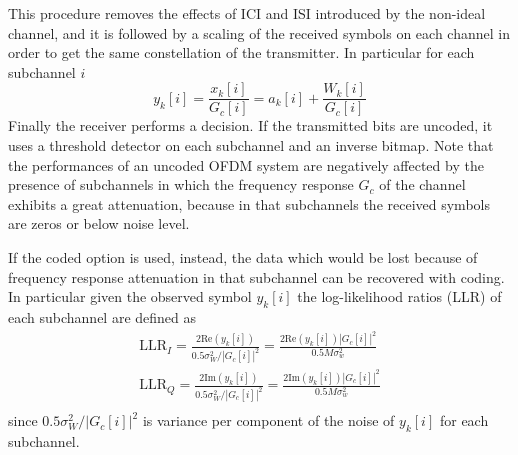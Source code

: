 \documentclass[10pt]{article}
\begin{document}
This procedure removes the effects of ICI and ISI introduced by the non-ideal channel, and it is followed by a scaling of the received symbols on each channel in order to get the same constellation of the transmitter. In particular for each subchannel $i$ 
\begin{equation}
	y_k[i] = \frac{x_k[i]}{G_c[i]} = a_k[i] + \frac{W_k[i]}{G_c[i]}
\end{equation}
Finally the receiver performs a decision. If the transmitted bits are uncoded, it uses a threshold detector on each subchannel and an inverse bitmap. Note that the performances of an uncoded OFDM system are negatively affected by the presence of subchannels in which the frequency response $G_c$ of the channel exhibits a great attenuation, because in that subchannels the received symbols are zeros or below noise level. 

If the coded option is used, instead, the data which would be lost because of frequency response attenuation in that subchannel can be recovered with coding. In particular given the observed symbol $y_k[i]$ the log-likelihood ratios (LLR) of each subchannel are defined as
\begin{eqnarray}
	\mathrm{LLR}_I = \frac{2\mathrm{Re}(y_k[i])}{0.5\sigma_W^2/|G_c[i]|^2} = \frac{2\mathrm{Re}(y_k[i]) |G_c[i]|^2 }{0.5 M \sigma_w^2} \\
	\mathrm{LLR}_Q = \frac{2\mathrm{Im}(y_k[i])}{0.5 \sigma_W^2/|G_c[i]|^2} = \frac{2\mathrm{Im}(y_k[i]) |G_c[i]|^2 }{0.5 M \sigma_w^2} \\
\end{eqnarray}
since $0.5 \sigma_W^2/|G_c[i]|^2$ is variance per component of the noise of $y_k[i]$ for each subchannel.
\end{document}
